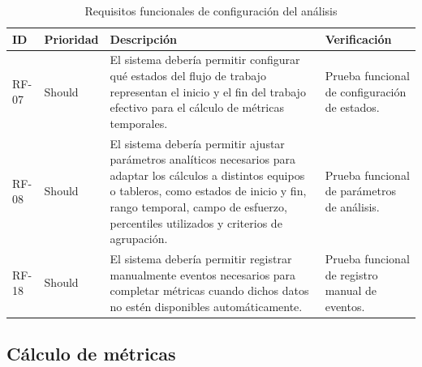 {\renewcommand{\arraystretch}{1.28}\footnotesize
\begin{longtable}{p{1.35cm}p{1.65cm}p{6.9cm}p{2.9cm}}
\caption{Requisitos funcionales de configuración del análisis}\label{tab:rf-configuracion-analisis}\\
\toprule
\textbf{ID} & \textbf{Prioridad} & \textbf{Descripción} & \textbf{Verificación} \\
\midrule
RF-07 & Should & El sistema debería permitir configurar qué estados del flujo de trabajo representan el inicio y el fin del trabajo efectivo para el cálculo de métricas temporales. & Prueba funcional de configuración de estados. \\
RF-08 & Should & El sistema debería permitir ajustar parámetros analíticos necesarios para adaptar los cálculos a distintos equipos o tableros, como estados de inicio y fin, rango temporal, campo de esfuerzo, percentiles utilizados y criterios de agrupación. & Prueba funcional de parámetros de análisis. \\
RF-18 & Should & El sistema debería permitir registrar manualmente eventos necesarios para completar métricas cuando dichos datos no estén disponibles automáticamente. & Prueba funcional de registro manual de eventos. \\
\bottomrule
\end{longtable}
\vspace{0.45em}
}

\subsection{Cálculo de métricas}

